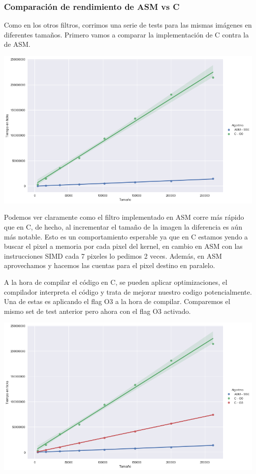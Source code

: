 \subsubsection*{Comparación de rendimiento de ASM vs C}
Como en los otros filtros, corrimos una serie de tests para las mismas imágenes en diferentes tamaños. Primero vamos a comparar la implementación de C contra la de ASM.
\begin{center} 
\includegraphics[scale=0.5]{img/maxCloser_CvsASM.png}
\end{center}

Podemos ver claramente como el filtro implementado en ASM corre más rápido que en C, de hecho, al incrementar el tamaño de la imagen la diferencia es aún más notable. Esto es un comportamiento esperable ya que en C estamos yendo a buscar el pixel a memoria por cada pixel del kernel, en cambio en ASM con las instrucciones SIMD cada 7 pixeles lo pedimos 2 veces. Además, en ASM aprovechamos y hacemos las cuentas para el pixel destino en paralelo. 

A la hora de compilar el código en C, se pueden aplicar optimizaciones, el compilador interpreta el código y trata de mejorar nuestro codigo potencialmente. Una de estas es aplicando el flag O3 a la hora de compilar. Comparemos el mismo set de test anterior pero ahora con el flag O3 activado.

\begin{center} 
\includegraphics[scale=0.5]{img/maxCloser_CvsASMvsO3.png}
\end{center}

